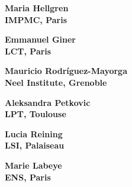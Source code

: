 \documentclass[20pt]{beamer}
\begin{document}
\begin{frame}
	\begin{center}
		\huge \bf Maria Hellgren
		\\
		\vspace{20mm}
		\large IMPMC, Paris
	\end{center}
\end{frame}

\begin{frame}
	\begin{center}
		\huge \bf Emmanuel Giner
		\\
		\vspace{20mm}
		\large  LCT, Paris
	\end{center}
\end{frame}

\begin{frame}
	\begin{center}
		\huge \bf Mauricio Rodríguez-Mayorga
		\\
		\vspace{20mm}
		\large  Neel Institute, Grenoble
	\end{center}
\end{frame}

\begin{frame}
	\begin{center}
		\huge \bf Aleksandra Petkovic
		\\
		\vspace{20mm}
		\large  LPT, Toulouse
	\end{center}
\end{frame}

\begin{frame}
	\begin{center}
		\huge \bf Lucia Reining
		\\
		\vspace{20mm}
		\large  LSI, Palaiseau
	\end{center}
\end{frame}

\begin{frame}
	\begin{center}
		\huge \bf Marie Labeye
		\\
		\vspace{20mm}
		\large  ENS, Paris
	\end{center}
\end{frame}
\end{document}
